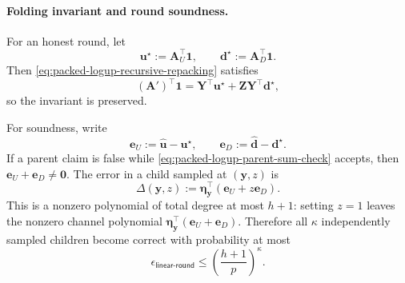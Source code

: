\documentclass[runningheads]{llncs}
\begin{document}
\paragraph{Folding invariant and round soundness.}
For an honest round, let
\[
    \bm u^\star:=\bm A_U^\top\bm1,
    \qquad
    \bm d^\star:=\bm A_D^\top\bm1.
\]
Then \eqref{eq:packed-logup-recursive-repacking} satisfies
\[
    (\bm A')^\top\bm1
      =\bm Y^\top\bm u^\star
       +\bm Z\bm Y^\top\bm d^\star,
\]
so the invariant is preserved.

For soundness, write
\[
    \bm e_U:=\widehat{\bm u}-\bm u^\star,
    \qquad
    \bm e_D:=\widehat{\bm d}-\bm d^\star.
\]
If a parent claim is false while
\eqref{eq:packed-logup-parent-sum-check} accepts, then
\(\bm e_U+\bm e_D\ne\bm0\).  The error in a child sampled at
\((\bm y,z)\) is
\begin{equation}
    \Delta(\bm y,z)
      :=\bm\eta_{\bm y}^\top(\bm e_U+z\bm e_D).
\label{eq:packed-logup-fold-error}
\end{equation}
This is a nonzero polynomial of total degree at most \(h+1\): setting
\(z=1\) leaves the nonzero channel polynomial
\(\bm\eta_{\bm y}^\top(\bm e_U+\bm e_D)\).  Therefore all
\(\kappa\) independently sampled children become correct with
probability at most
\begin{equation}
    \epsilon_{\mathsf{linear\mbox{-}round}}
      \leq
      \left(\frac{h+1}{p}\right)^\kappa.
\label{eq:packed-logup-linear-round-soundness}
\end{equation}
\end{document}
